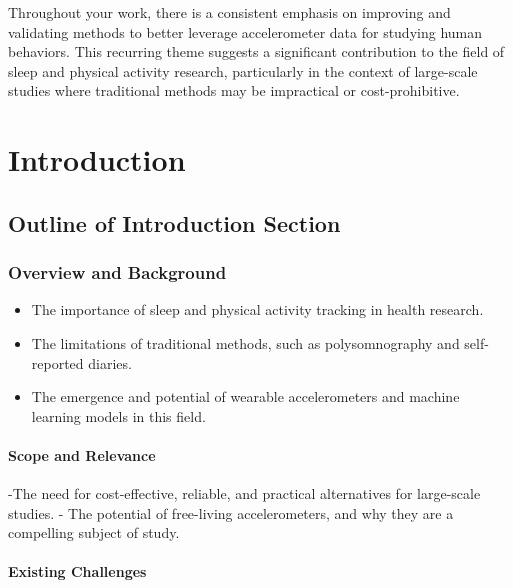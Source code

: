 \documentclass[
  8pt,
  letterpaper,
  DIV=11,
  numbers=noendperiod]{scrartcl}
\let\oldparagraph\paragraph
\renewcommand{\paragraph}[1]{\oldparagraph{#1}\mbox{}}
\providecommand{\tightlist}{%
  \setlength{\itemsep}{0pt}\setlength{\parskip}{0pt}}\usepackage{longtable,booktabs,array}
\begin{document}
Throughout your work, there is a consistent emphasis on improving and
validating methods to better leverage accelerometer data for studying
human behaviors. This recurring theme suggests a significant
contribution to the field of sleep and physical activity research,
particularly in the context of large-scale studies where traditional
methods may be impractical or cost-prohibitive.

\hypertarget{introduction}{%
\section{Introduction}\label{introduction}}

\hypertarget{outline-of-introduction-section}{%
\subsection{Outline of Introduction
Section}\label{outline-of-introduction-section}}

\hypertarget{overview-and-background}{%
\subsubsection{Overview and Background}\label{overview-and-background}}

\begin{itemize}
\tightlist
\item
  The importance of sleep and physical activity tracking in health
  research.
\item
  The limitations of traditional methods, such as polysomnography and
  self-reported diaries.
\item
  The emergence and potential of wearable accelerometers and machine
  learning models in this field.
\end{itemize}

\hypertarget{scope-and-relevance}{%
\paragraph{Scope and Relevance}\label{scope-and-relevance}}

-The need for cost-effective, reliable, and practical alternatives for
large-scale studies. - The potential of free-living accelerometers, and
why they are a compelling subject of study.

\hypertarget{existing-challenges}{%
\paragraph{Existing Challenges}\label{existing-challenges}}
\end{document}
